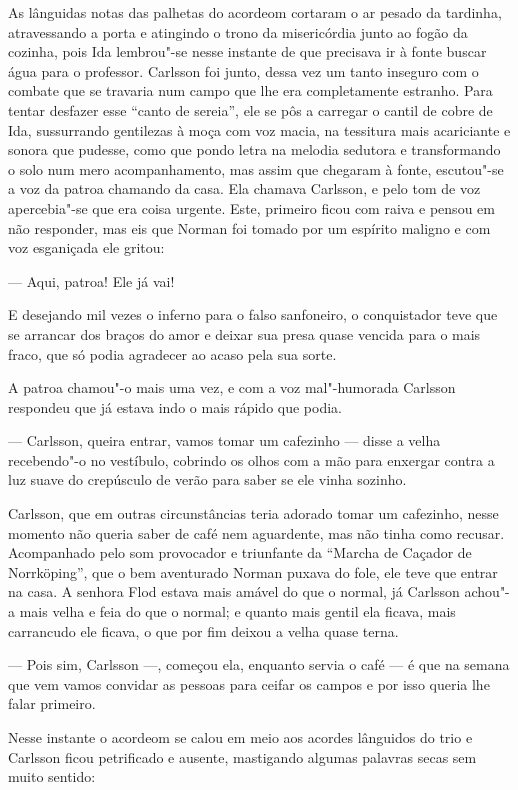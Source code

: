 As lânguidas notas das palhetas do acordeom cortaram o ar pesado da tardinha,
atravessando a porta e atingindo o trono da misericórdia junto ao fogão da
cozinha, pois Ida lembrou"-se nesse instante de que precisava ir à fonte
buscar água para o professor. Carlsson foi junto, dessa vez um tanto inseguro
com o combate que se travaria num campo que lhe era completamente estranho. Para
tentar desfazer esse ``canto de sereia'', ele se pôs a carregar o cantil de
cobre de Ida, sussurrando gentilezas à moça com voz macia, na tessitura mais
acariciante e sonora que pudesse, como que pondo letra na melodia sedutora e
transformando o solo num mero acompanhamento, mas assim que chegaram à fonte,
escutou"-se a voz da patroa chamando da casa. Ela chamava Carlsson, e pelo tom de
voz apercebia"-se que era coisa urgente. Este, primeiro ficou com raiva e
pensou em não responder, mas eis que Norman foi tomado por um espírito maligno e
com voz esganiçada ele gritou:

--- Aqui, patroa! Ele já vai!

E desejando mil vezes o inferno para o falso sanfoneiro, o conquistador teve que
se arrancar dos braços do amor e deixar sua presa quase vencida para o mais
fraco, que só podia agradecer ao acaso pela sua sorte.

A patroa chamou"-o mais uma vez, e com a voz mal"-humorada Carlsson respondeu que já
estava indo o mais rápido que podia.

--- Carlsson, queira entrar, vamos tomar um cafezinho --- disse a velha
recebendo"-o no vestíbulo, cobrindo os olhos com a mão para enxergar contra a luz
suave do crepúsculo de verão para saber se ele vinha sozinho.

Carlsson, que em outras circunstâncias teria adorado tomar um cafezinho, nesse momento
não queria saber de café nem aguardente, mas não tinha como recusar.
Acompanhado pelo som provocador e triunfante da ``Marcha de Caçador de
Norrköping'', que o bem aventurado Norman puxava do fole, ele teve que entrar na
casa. A senhora Flod estava mais amável do que o normal, já Carlsson achou"-a
mais velha e feia do que o normal; e quanto mais gentil ela ficava, mais
carrancudo ele ficava, o que por fim deixou a velha quase terna.

--- Pois sim, Carlsson ---, começou ela, enquanto servia o café --- é que na semana
que vem vamos convidar as pessoas para ceifar os campos e por isso queria lhe
falar primeiro.

Nesse instante o acordeom se calou em meio aos acordes lânguidos do trio e
Carlsson ficou petrificado e ausente, mastigando algumas palavras secas sem
muito sentido:

